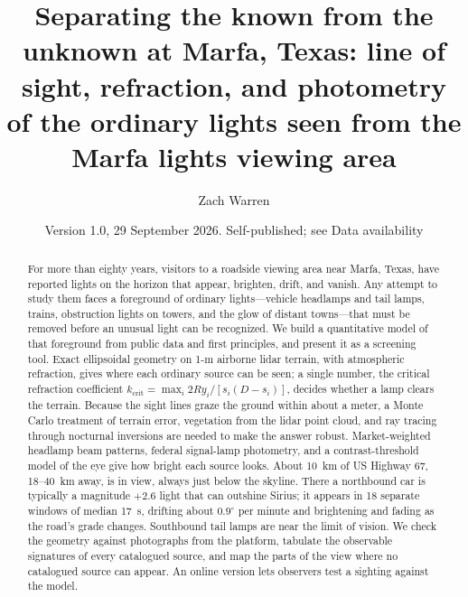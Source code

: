 \documentclass[aip,jap,amsmath,amssymb,reprint,floatfix]{revtex4-2}
\newif\ifanonymous
\newcommand{\kc}{k_{\mathrm{crit}}}
\begin{document}
\title{Separating the known from the unknown at Marfa, Texas: line of sight, refraction, and photometry of the ordinary lights seen from the Marfa lights viewing area}

\ifanonymous
\author{[Author withheld for review]}
\else
\author{Zach Warren}
\fi

\date{Version 1.0, 29 September 2026. Self-published; see Data availability}

\begin{abstract}
For more than eighty years, visitors to a roadside viewing area near Marfa, Texas, have reported lights on the horizon that appear, brighten, drift, and vanish. Any attempt to study them faces a foreground of ordinary lights---vehicle headlamps and tail lamps, trains, obstruction lights on towers, and the glow of distant towns---that must be removed before an unusual light can be recognized. We build a quantitative model of that foreground from public data and first principles, and present it as a screening tool. Exact ellipsoidal geometry on 1-m airborne lidar terrain, with atmospheric refraction, gives where each ordinary source can be seen; a single number, the critical refraction coefficient $\kc=\max_i 2Ry_i/[s_i(D-s_i)]$, decides whether a lamp clears the terrain. Because the sight lines graze the ground within about a meter, a Monte Carlo treatment of terrain error, vegetation from the lidar point cloud, and ray tracing through nocturnal inversions are needed to make the answer robust. Market-weighted headlamp beam patterns, federal signal-lamp photometry, and a contrast-threshold model of the eye give how bright each source looks. About 10~km of US Highway 67, 18--40~km away, is in view, always just below the skyline. There a northbound car is typically a magnitude $+2.6$ light that can outshine Sirius; it appears in 18 separate windows of median 17~s, drifting about $0.9^\circ$ per minute and brightening and fading as the road's grade changes. Southbound tail lamps are near the limit of vision. We check the geometry against photographs from the platform, tabulate the observable signatures of every catalogued source, and map the parts of the view where no catalogued source can appear. An online version lets observers test a sighting against the model.
\end{abstract}

\maketitle
\end{document}
